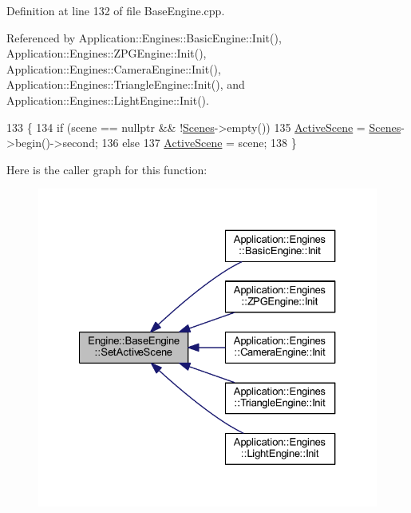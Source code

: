 Definition at line 132 of file Base\+Engine.\+cpp.



Referenced by Application\+::\+Engines\+::\+Basic\+Engine\+::\+Init(), Application\+::\+Engines\+::\+Z\+P\+G\+Engine\+::\+Init(), Application\+::\+Engines\+::\+Camera\+Engine\+::\+Init(), Application\+::\+Engines\+::\+Triangle\+Engine\+::\+Init(), and Application\+::\+Engines\+::\+Light\+Engine\+::\+Init().


\begin{DoxyCode}
133 \{
134     \textcolor{keywordflow}{if} (scene == \textcolor{keyword}{nullptr} && !\mbox{\hyperlink{classEngine_1_1BaseEngine_afd02af3c2fbe9bb734db014dec06585a}{Scenes}}->empty())
135         \mbox{\hyperlink{classEngine_1_1BaseEngine_adb3dbc839da9d821e08b18d8a221698d}{ActiveScene}} = \mbox{\hyperlink{classEngine_1_1BaseEngine_afd02af3c2fbe9bb734db014dec06585a}{Scenes}}->begin()->second;
136     \textcolor{keywordflow}{else}
137         \mbox{\hyperlink{classEngine_1_1BaseEngine_adb3dbc839da9d821e08b18d8a221698d}{ActiveScene}} = scene;     
138 \}
\end{DoxyCode}
Here is the caller graph for this function\+:
\nopagebreak
\begin{figure}[H]
\begin{center}
\leavevmode
\includegraphics[width=327pt]{classEngine_1_1BaseEngine_afc82c6a00d5a9d4714740fc5eab5db86_icgraph}
\end{center}
\end{figure}
\mbox{\label{classEngine_1_1BaseEngine_a525fdc7a1da7eecb514ad5763f06be79}} 
